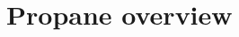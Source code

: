 \documentclass[10pt]{sigalternate052015}
\newcommand{\todo}[1]{\textcolor{red}{[TODO: #1]}}
\begin{document}
%
%
%
%





%
%
%
%

\section{Propane overview}
\label{sec:propane}
\end{document}
